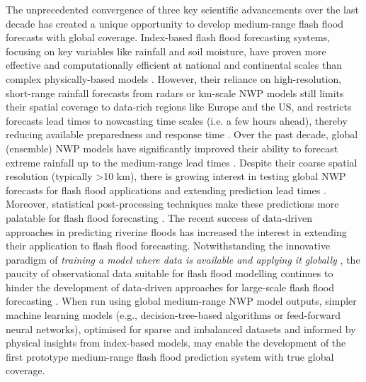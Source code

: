 The  unprecedented convergence of three key scientific advancements over the last decade has created a unique opportunity to develop medium-range flash flood forecasts with global coverage. Index-based flash flood forecasting systems, focusing on key variables like rainfall and soil moisture, have proven more effective and computationally efficient at national and continental scales than complex physically-based models  \citep{Alfieri2015b}. However, their reliance on high-resolution, short-range rainfall forecasts from radars or km-scale NWP models still limits their spatial coverage to data-rich regions like Europe and the US, and restricts forecasts lead times to nowcasting time scales (i.e. a few hours ahead), thereby reducing available preparedness and response time \citep{Luong2021, Maybee2024}. Over the past decade, global (ensemble) NWP models have significantly improved their ability to forecast extreme rainfall up to the medium-range lead times \citep{Lavers2021, Haiden2023}. Despite their coarse spatial resolution (typically >10 km), there is growing interest in testing global NWP forecasts for flash flood applications and extending prediction lead times \citep{Bucherie2022}. Moreover, statistical post-processing techniques make these predictions more palatable for flash flood forecasting \citep{Vannitsem2021}. The recent success of data-driven approaches in predicting riverine floods \citep{Nearing2024} has increased the interest in extending their application to flash flood forecasting. Notwithstanding the innovative paradigm of \textit{training a model where data is available and applying it globally} \citep{Kratzert2024}, the paucity of observational data suitable for flash flood modelling continues to hinder the development of data-driven approaches for large-scale flash flood forecasting \citep{Alzubaidi2023}. When run using global medium-range NWP model outputs, simpler machine learning models (e.g., decision-tree-based algorithms or feed-forward neural networks), optimised for sparse and imbalanced datasets and informed by physical insights from index-based models, may enable the development of the first prototype medium-range flash flood prediction system with true global coverage.


